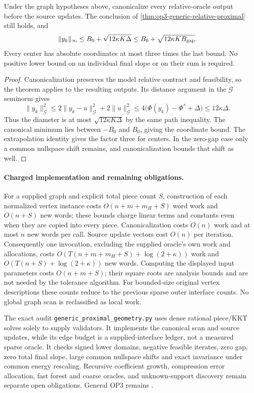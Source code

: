 \begin{corollary}
\label{cor:op3-generic-canonical-ranges}
Under the graph hypotheses above, canonicalize every relative-oracle
output before the source updates. The conclusion of
\cref{thm:op3-generic-relative-proximal} still holds, and
\[
 \|y_k\|_\infty\leq B_0+\sqrt{12\kappa K\Delta}
 \leq B_0+\sqrt{12\kappa K B_{\rm gap}}.
\]
Every center has absolute coordinates at most three times the last bound.
No positive lower bound on an individual final slope or on their sum is
required.
\end{corollary}
\begin{proof}
Canonicalization preserves the model relative contract and feasibility,
so the theorem applies to the resulting outputs. Its distance argument
in the $\mathcal G$ seminorm gives
\[
 \|y_k\|_{\mathcal G}^2
 \leq2\|y_k-u\|_{\mathcal G}^2+2\|u\|_{\mathcal G}^2
 \leq4\bigl(\Phi(y_k)-\Phi^*+\Delta\bigr)\leq12\kappa\Delta.
\]
Thus the diameter is at most $\sqrt{12\kappa K\Delta}$ by the same
path inequality. The canonical minimum lies between $-B_0$ and $B_0$,
giving the coordinate bound. The extrapolation identity gives the factor
three for centers. In the zero-gap case only a common nullspace shift
remains, and canonicalization bounds that shift as well.
\end{proof}

\paragraph{Charged implementation and remaining obligations.}
For a supplied graph and explicit total piece count $S$, construction of
each normalized vertex instance costs $O(n+m+m_H+S)$ word work and
$O(n+S)$ new words; these bounds charge linear terms and constants even
when they are copied into every piece. Canonicalization costs $O(n)$
work and at most $n$ new words per call. Source update vectors cost
$O(n)$ per iteration. Consequently one invocation, excluding the supplied
oracle's own work and allocations, costs
$O(T(n+m+m_H+S)+\log(2+\kappa))$ work and
$O(T(n+S)+\log(2+\kappa))$ new words. Computing the displayed input
parameters costs $O(n+m+S)$; their square roots are analysis bounds and
are not needed by the tolerance algorithm. For bounded-size original
vertex descriptions these counts reduce to the previous sparse outer
interface counts. No global graph scan is reclassified as local work.

The exact audit \texttt{generic\_proximal\_geometry.py} uses dense rational
piece/KKT solves solely to supply validators. It implements the canonical
scan and source updates, while its edge budget is a supplied-interface
ledger, not a measured sparse oracle. It checks signed lower domains,
negative feasible iterates, zero gap, zero total final slope, large common
nullspace shifts and exact invariance under common energy rescaling.
Recursive coefficient growth, compression error allocation, fast forest
and coarse oracles, and unknown-support discovery remain separate open
obligations. General OP3 remains \statusopen{}.
